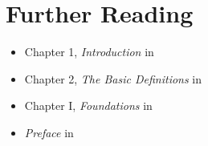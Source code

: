 \section{Further Reading}

\begin{frame}

  \begin{itemize}
   \item Chapter 1, \emph{Introduction} in \cite{CyganFKL+15}
   \item Chapter 2, \emph{The Basic Definitions} in \cite{DowneyF13}
   \item Chapter I, \emph{Foundations} in \cite{Niedermeier06}
   \item \emph{Preface} in \cite{FlumG06}
  \end{itemize}

\end{frame}

\begin{frame}[t, allowframebreaks]
	\printbibliography
\end{frame}


